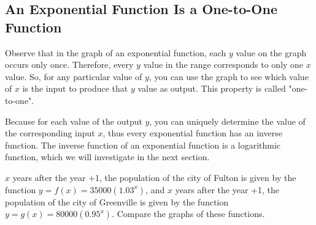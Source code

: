 \subsection{An Exponential Function Is a One-to-One Function}

Observe that in the graph of an exponential function, each \( y \) value on the graph occurs only once. Therefore, every \( y \) value in the range corresponds to only one \( x \) value. So, for any particular value of \( y \), you can use the graph to see which value of \( x \) is the input to produce that \( y \) value as output. This property is called "one-to-one".

Because for each value of the output \( y \), you can uniquely determine the value of the corresponding input \( x \), thus every exponential function has an inverse function. The inverse function of an exponential function is a logarithmic function, which we will investigate in the next section.

\begin{example}
    $x$ years after the year \the\numexpr\year+1\relax, the population of the city of Fulton is given by the function $y=f(x) = 35000(1.03^x)$, and $x$ years after the year \the\numexpr\year+1\relax, the population of the city of Greenville is given by the function $y = g(x) = 80000(0.95^x)$. Compare the graphs of these functions.
\end{example}

